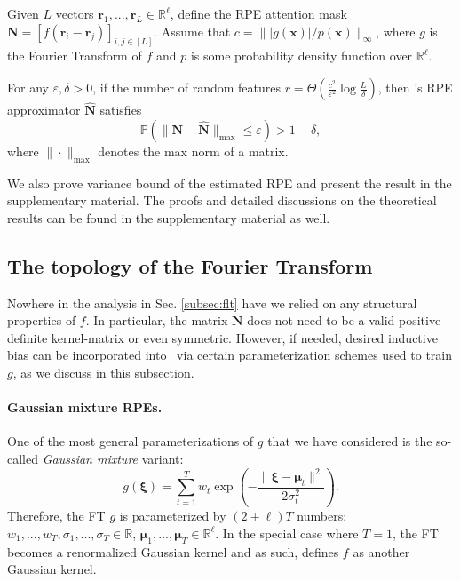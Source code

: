 \begin{theorem}\label{thm:sample-complexity-flt}
    Given $L$ vectors $\mathbf{r}_{1},...,\mathbf{r}_{L} \in \mathbb{R}^{\ell}$, define the RPE attention mask $\mathbf{N} = [f(\mathbf{r}_{i}-\mathbf{r}_{j})]_{i,j\in [L]}$.   
    Assume that $c= \||g(\mathbf{x})|/p(\mathbf{x})\|_{\infty}$, where $g$ is the Fourier Transform of $f$ and $p$ is some probability density function over $\mathbb{R}^{\ell}$.
    
    For any $\varepsilon, \delta>0$, if the number of random features $r=\Theta \left(\frac{c^2}{\varepsilon^2}\log\frac{L}{\delta}\right)$, then \FLT 's RPE approximator $\widehat{\mathbf{N}}$ satisfies 
    $$\mathbb{P}\left(\|\mathbf{N}-\widehat{\mathbf{N}}\|_{\max}\leq \varepsilon \right)>1-\delta,$$
    where $\|\cdot\|_{\max}$ denotes the max norm of a matrix.
\end{theorem}

We also prove variance bound of the estimated RPE and present the result in the supplementary material. The proofs and detailed discussions on the theoretical results can be found in the supplementary material as well.

\subsection{The topology of the Fourier Transform}
\label{sec:topology}

Nowhere in the analysis in Sec. \ref{subsec:flt} have we relied on any structural properties of $f$. In particular, the matrix $\mathbf{N}$ does not need to be a valid positive definite kernel-matrix or even symmetric. However, if needed, desired inductive bias can be incorporated into \FLT~via certain parameterization schemes used to train $g$, as we discuss in this subsection.

\paragraph{Gaussian mixture RPEs.} One of the most general parameterizations of $g$ that we have considered is the so-called \textit{Gaussian mixture} variant:
\begin{equation*}
g(\boldsymbol{\xi}) = \sum_{t=1}^{T} w_{t} \exp\left(-\frac{\|\boldsymbol{\xi}-\boldsymbol{\mu}_{t}\|^{2}}{2 \sigma_{t}^{2}}\right).\label{eq:gaussian-mixture-rpe}
\end{equation*}
Therefore, the FT $g$ is parameterized by $(2+\ell)T$ numbers: $w_{1},...,w_{T},\sigma_{1},...,\sigma_{T} \in \mathbb{R}$, $\boldsymbol{\mu}_{1},...,\boldsymbol{\mu}_{T} \in \mathbb{R}^{\ell}$. In the special case where $T=1$, the FT becomes a renormalized Gaussian kernel and as such, defines $f$ as another Gaussian kernel. 

